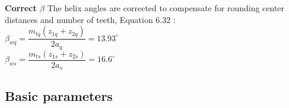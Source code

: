 \textbf{Correct $ \beta $} The helix angles are corrected to compensate for rounding center distances and number of teeth, Equation 6.32 \cite{tk1}:\\
$ \beta_{wq} = \dfrac{m_{tq}(z_{1q}+z_{2q})}{2a_q} = 13.93 ^\circ$\\
$ \beta_{ws} = \dfrac{m_{ts}(z_{1s}+z_{2s})}{2a_s} = 16.6 ^\circ$

%


\subsection{Basic parameters}

